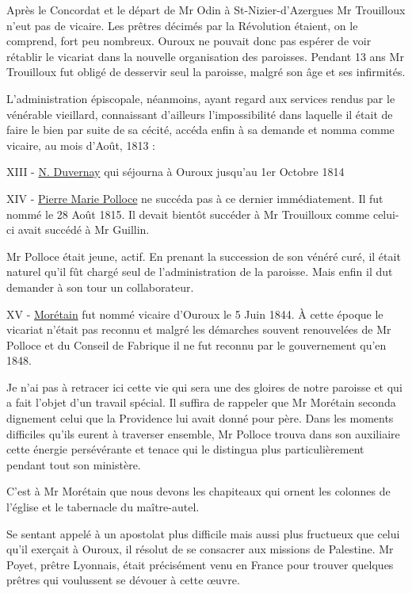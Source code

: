 Après le Concordat et le départ de Mr Odin à St-Nizier-d'Azergues Mr Trouilloux n'eut pas de vicaire. Les prêtres décimés par la Révolution étaient, on le comprend, fort peu nombreux. Ouroux ne pouvait donc pas espérer de voir rétablir le vicariat dans la nouvelle organisation des paroisses. Pendant 13 ans Mr Trouilloux fut obligé de desservir seul la paroisse, malgré son âge et ses infirmités.

{\setlength{\emergencystretch}{2em}
L'administration épiscopale, néanmoins, ayant regard aux services rendus par le vénérable vieillard, connaissant d'ailleurs l'impossibilité
dans laquelle il était de faire le bien par suite de sa cécité, accéda enfin à sa demande et nomma comme vicaire, au mois d'Août, 1813 :\par}

XIII - \underline{N. Duvernay} qui séjourna à Ouroux jusqu'au 1er Octobre 1814

XIV - \underline{Pierre Marie Polloce} ne succéda pas à ce dernier immédiatement. Il fut nommé le 28 Août 1815. Il devait bientôt succéder à Mr Trouilloux comme celui-ci avait succédé à Mr Guillin.

Mr Polloce était jeune, actif. En prenant la succession de son vénéré curé, il était naturel qu'il fût chargé seul de l'administration de la paroisse. Mais enfin il dut demander à son tour un collaborateur.

XV - \underline{Morétain} fut nommé vicaire d'Ouroux le 5 Juin 1844. À cette époque le vicariat n'était pas reconnu et malgré les démarches souvent renouvelées de Mr Polloce et du Conseil de Fabrique il ne fut reconnu par le gouvernement qu'en 1848.

\enlargethispage{2\baselineskip}
Je n'ai pas à retracer ici cette vie qui sera une des gloires de notre paroisse et qui a fait l'objet d'un travail spécial. Il suffira de rappeler que Mr Morétain seconda dignement celui que la Providence lui avait donné pour père. Dans les moments difficiles qu'ils eurent à traverser ensemble, Mr Polloce trouva dans son auxiliaire cette énergie persévérante et tenace qui le distingua plus particulièrement pendant tout son ministère.

C'est à Mr Morétain que nous devons les chapiteaux qui ornent les colonnes de l'église et le tabernacle du maître-autel.

Se sentant appelé à un apostolat plus difficile mais aussi plus fructueux que celui qu'il exerçait à Ouroux, il résolut de se consacrer aux missions de Palestine. Mr Poyet, prêtre Lyonnais, était précisément venu en France pour trouver quelques prêtres qui voulussent se dévouer à cette œuvre.


